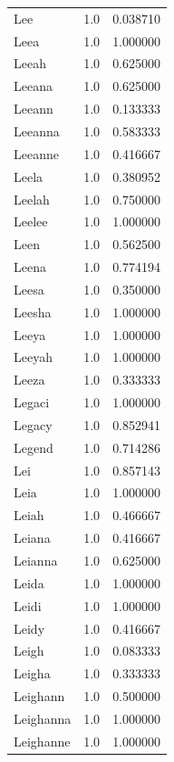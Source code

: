 \documentclass[
  letterpaper,
  DIV=11,
  numbers=noendperiod]{scrreprt}
\begin{document}
\begin{tabular}{lrr}
Lee             &   1.0 &   0.038710 \\
Leea            &   1.0 &   1.000000 \\
Leeah           &   1.0 &   0.625000 \\
Leeana          &   1.0 &   0.625000 \\
Leeann          &   1.0 &   0.133333 \\
Leeanna         &   1.0 &   0.583333 \\
Leeanne         &   1.0 &   0.416667 \\
Leela           &   1.0 &   0.380952 \\
Leelah          &   1.0 &   0.750000 \\
Leelee          &   1.0 &   1.000000 \\
Leen            &   1.0 &   0.562500 \\
Leena           &   1.0 &   0.774194 \\
Leesa           &   1.0 &   0.350000 \\
Leesha          &   1.0 &   1.000000 \\
Leeya           &   1.0 &   1.000000 \\
Leeyah          &   1.0 &   1.000000 \\
Leeza           &   1.0 &   0.333333 \\
Legaci          &   1.0 &   1.000000 \\
Legacy          &   1.0 &   0.852941 \\
Legend          &   1.0 &   0.714286 \\
Lei             &   1.0 &   0.857143 \\
Leia            &   1.0 &   1.000000 \\
Leiah           &   1.0 &   0.466667 \\
Leiana          &   1.0 &   0.416667 \\
Leianna         &   1.0 &   0.625000 \\
Leida           &   1.0 &   1.000000 \\
Leidi           &   1.0 &   1.000000 \\
Leidy           &   1.0 &   0.416667 \\
Leigh           &   1.0 &   0.083333 \\
Leigha          &   1.0 &   0.333333 \\
Leighann        &   1.0 &   0.500000 \\
Leighanna       &   1.0 &   1.000000 \\
Leighanne       &   1.0 &   1.000000 \\

\end{tabular}
\end{document}
